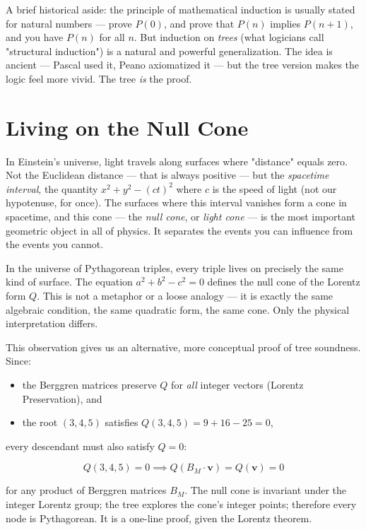 A brief historical aside: the principle of mathematical induction is usually stated for natural numbers --- prove $P(0)$, and prove that $P(n)$ implies $P(n+1)$, and you have $P(n)$ for all $n$. But induction on \textit{trees} (what logicians call "structural induction") is a natural and powerful generalization. The idea is ancient --- Pascal used it, Peano axiomatized it --- but the tree version makes the logic feel more vivid. The tree \textit{is} the proof.


\bigskip


\section{Living on the Null Cone}

In Einstein's universe, light travels along surfaces where "distance" equals zero. Not the Euclidean distance --- that is always positive --- but the \textit{spacetime interval}, the quantity $x^2 + y^2 - (ct)^2$ where $c$ is the speed of light (not our hypotenuse, for once). The surfaces where this interval vanishes form a cone in spacetime, and this cone --- the \textit{null cone}, or \textit{light cone} --- is the most important geometric object in all of physics. It separates the events you can influence from the events you cannot.

In the universe of Pythagorean triples, every triple lives on precisely the same kind of surface. The equation $a^2 + b^2 - c^2 = 0$ defines the null cone of the Lorentz form $Q$. This is not a metaphor or a loose analogy --- it is exactly the same algebraic condition, the same quadratic form, the same cone. Only the physical interpretation differs.

This observation gives us an alternative, more conceptual proof of tree soundness. Since:

\begin{itemize}
\item the Berggren matrices preserve $Q$ for \textit{all} integer vectors (Lorentz Preservation), and
\item the root $(3, 4, 5)$ satisfies $Q(3, 4, 5) = 9 + 16 - 25 = 0$,
\end{itemize}
every descendant must also satisfy $Q = 0$:

\[
Q(3, 4, 5) = 0 \implies Q(B_M \cdot \mathbf{v}) = Q(\mathbf{v}) = 0
\]

for any product of Berggren matrices $B_M$. The null cone is invariant under the integer Lorentz group; the tree explores the cone's integer points; therefore every node is Pythagorean. It is a one-line proof, given the Lorentz theorem.

